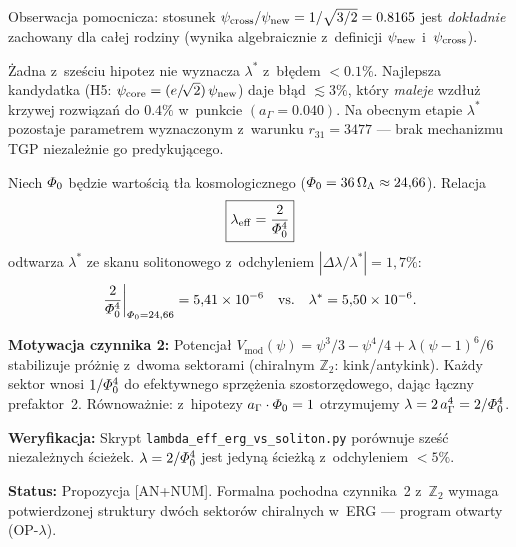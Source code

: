 Obserwacja pomocnicza: stosunek $\psi_{\rm cross}/\psi_{\rm new} = 1/\sqrt{3/2}
= 0.8165$ jest \emph{dokładnie} zachowany dla całej rodziny
(wynika algebraicznie z~definicji $\psi_{\rm new}$ i~$\psi_{\rm cross}$).

\begin{result}%
\label{res:p2}
Żadna z~sześciu hipotez nie wyznacza $\lambda^*$ z~błędem $<0.1\%$.
Najlepsza kandydatka (H5: $\psi_{\rm core} = (e/\!\sqrt{2})\,\psi_{\rm new}$)
daje błąd $\lesssim 3\%$, który \emph{maleje} wzdłuż krzywej rozwiązań
do $0.4\%$ w~punkcie $(a_\Gamma = 0.040)$.
Na obecnym etapie $\lambda^*$ pozostaje parametrem wyznaczonym
z~warunku $r_{31} = 3477$ — brak mechanizmu TGP niezależnie
go predykującego.
\end{result}

\begin{proposition}%
\label{prop:I-lambda-Z2}
Niech $\varPhi_0$ b\k{e}dzie warto\'sci\k{a} t\l{}a kosmologicznego
($\varPhi_0 = 36\,\Omega_\Lambda \approx 24{,}66$). Relacja
\begin{equation}\label{eq:I-lambda-from-Phi0}
  \boxed{\lambda_{\mathrm{eff}} = \frac{2}{\varPhi_0^4}}
\end{equation}
odtwarza $\lambda^*$ ze skanu solitonowego z~odchyleniem
$|\Delta\lambda/\lambda^*| = 1{,}7\%$:
\[
  \frac{2}{\varPhi_0^4}\bigg|_{\varPhi_0 = 24{,}66}
  = 5{,}41 \times 10^{-6}
  \quad\text{vs.}\quad
  \lambda^* = 5{,}50 \times 10^{-6}.
\]

\medskip\noindent\textbf{Motywacja czynnika 2:}
Potencja\l{} $V_{\mathrm{mod}}(\psi) = \psi^3/3 - \psi^4/4
+ \lambda(\psi - 1)^6/6$ stabilizuje pr\'o\.zni\k{e}
z~dwoma sektorami (chiralnym $\mathbb{Z}_2$: kink/antykink).
Ka\.zdy sektor wnosi $1/\varPhi_0^4$ do efektywnego
sprz\k{e}\.zenia szostorz\k{e}dowego, daj\k{a}c
\l{}\k{a}czny prefaktor~2.
R\'ownowa\.znie: z~hipotezy $a_\Gamma\cdot\varPhi_0 = 1$
otrzymujemy $\lambda = 2\,a_\Gamma^4 = 2/\varPhi_0^4$.

\medskip\noindent\textbf{Weryfikacja:}
Skrypt \texttt{lambda\_eff\_erg\_vs\_soliton.py}
por\'ownuje sze\'s\'c niezale\.znych \'scie\.zek.
$\lambda = 2/\varPhi_0^4$ jest jedyn\k{a} \'scie\.zk\k{a}
z~odchyleniem $< 5\%$.

\medskip\noindent
\textbf{Status:} Propozycja [AN+NUM].
Formalna pochodna czynnika~2 z~$\mathbb{Z}_2$
wymaga potwierdzonej struktury
dw\'och sektor\'ow chiralnych w~ERG ---
program otwarty (OP-$\lambda$).
\end{proposition}

